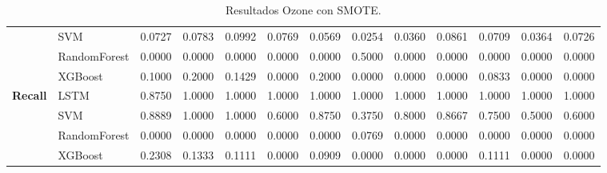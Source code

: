 \begin{table}[h]
\begin{adjustbox}{max width=15cm}
\begin{tabular}{|c|l|r|r|r|r|r|r|r|r|r|r|r|}
			& SVM &  0.0727 &  0.0783 &  0.0992 &  0.0769 &  0.0569 &  0.0254 &  0.0360 &  0.0861 &  0.0709 &  0.0364 &  0.0726 \\
			& RandomForest &  0.0000 &  0.0000 &  0.0000 &  0.0000 &  0.0000 &  0.5000 &  0.0000 &  0.0000 &  0.0000 &  0.0000 &  0.0000 \\
			& XGBoost &  0.1000 &  0.2000 &  0.1429 &  0.0000 &  0.2000 &  0.0000 &  0.0000 &  0.0000 &  0.0833 &  0.0000 &  0.0000 \\
			\hline
			\textbf{Recall} & LSTM &  0.8750 &  1.0000 &  1.0000 &  1.0000 &  1.0000 &  1.0000 &  1.0000 &  1.0000 &  1.0000 &  1.0000 &  1.0000 \\
			& SVM &  0.8889 &  1.0000 &  1.0000 &  0.6000 &  0.8750 &  0.3750 &  0.8000 &  0.8667 &  0.7500 &  0.5000 &  0.6000 \\
			& RandomForest &  0.0000 &  0.0000 &  0.0000 &  0.0000 &  0.0000 &  0.0769 &  0.0000 &  0.0000 &  0.0000 &  0.0000 &  0.0000 \\
			& XGBoost &  0.2308 &  0.1333 &  0.1111 &  0.0000 &  0.0909 &  0.0000 &  0.0000 &  0.0000 &  0.1111 &  0.0000 &  0.0000 \\
			\hline
		\end{tabular}
	\end{adjustbox}
	\caption{Resultados Ozone con SMOTE.}
	\label{tab:Ozone_SMOTE}
\end{table}
\newpage
